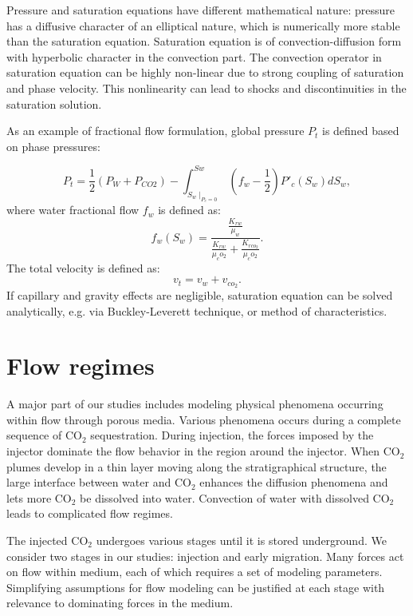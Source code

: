 Pressure and saturation equations have different mathematical nature: pressure
has a diffusive character of an elliptical nature, which is numerically more
stable than the saturation equation. Saturation equation is of
convection-diffusion form with hyperbolic character in the convection part. The
convection operator in saturation equation can be highly non-linear due to
strong coupling of saturation and phase velocity. This nonlinearity can lead to
shocks and discontinuities in the saturation solution.
 
As an example of fractional flow formulation, global pressure $P_t$ is defined
based on phase pressures:
 
\begin{equation}
 P_t=\frac{1}{2} (P_W+P_{CO2})-\int^{Sw}_{S_w
\mid_{P_c=0}}(f_w-\frac{1}{2}){P'}_c(S_w)dS_w,
 \label{eq:GP}
\end{equation} where water fractional flow $f_w$ is defined as:
\begin{equation}
 f_w(S_w)=\frac{\frac{K_{rw}}{\mu_w}}{\frac{K_{rw}}{\mu_co_2}+\frac{K_{rco_2}}{
\mu_co_2}}.
 \label{eq:fw}
\end{equation} The total velocity is defined as:
\begin{equation}
 v_t=v_w+v_{co_2}.
 \label{eq:VT}
\end{equation}If capillary and gravity effects are negligible, saturation
equation can be solved analytically, e.g. via Buckley-Leverett technique, or
method of characteristics.


\section{Flow regimes}
\label{sec:FlowRegimes}

A major part of our studies includes modeling physical phenomena occurring
within
flow through porous media. Various phenomena occurs during a complete sequence
of $\mbox{CO}_2$ sequestration. During injection, the forces imposed by the injector
dominate the flow behavior in the region around the injector. When $\mbox{CO}_2$
plumes develop in a thin layer moving along the stratigraphical structure, the large interface between water and $\mbox{CO}_2$ enhances the diffusion phenomena
and lets more $\mbox{CO}_2$ be dissolved into water. Convection of water with
dissolved $\mbox{CO}_2$ leads to complicated flow regimes.

The injected $\mbox{CO}_2$ undergoes various stages until it is stored
underground. We consider two stages in our studies: injection and early
migration. Many forces act on flow within medium, each
of which requires a set of modeling parameters. Simplifying assumptions for flow
modeling can be justified at each stage with relevance to dominating forces in
the medium.

